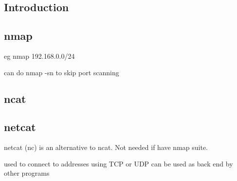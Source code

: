 
\subsection{Introduction}

\subsection{nmap}

eg nmap 192.168.0.0/24

can do nmap -sn to skip port scanning
\subsection{ncat}

\subsection{netcat}

netcat (nc) is an alternative to ncat. Not needed if have nmap suite.

used to connect to addresses using TCP or UDP
can be used as back end by other programs
